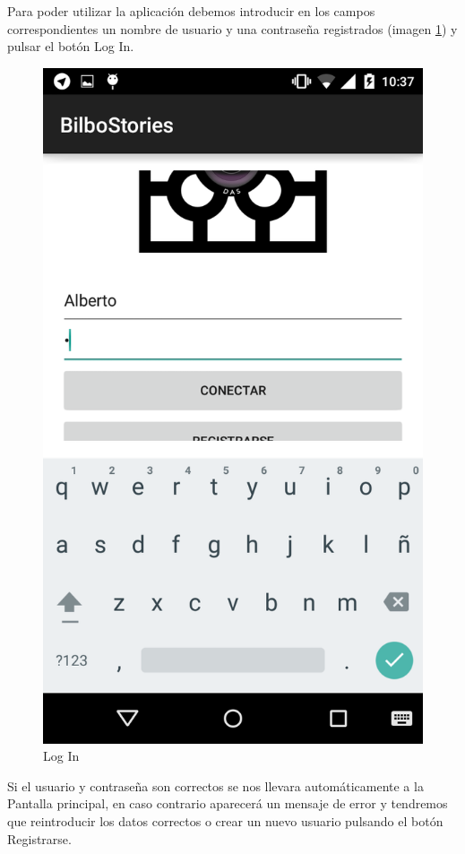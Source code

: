 \documentclass[11pt,a4paper, titlepage]{article}
\begin{document}
Para poder utilizar la aplicación debemos introducir en los campos correspondientes un nombre de usuario y una contraseña registrados (imagen \ref{login2}) y pulsar el botón Log In.
	
	\begin{figure}[hbtp]
		\centering
		\includegraphics[scale = 0.25 ]{img/1}
		\caption{Log In}
		\label{login2}
	\end{figure}
	
	Si el usuario y contraseña son correctos se nos llevara automáticamente a la Pantalla principal, en caso contrario aparecerá un mensaje de error y tendremos que reintroducir los datos correctos o crear un nuevo usuario pulsando el botón Registrarse.
	
\end{document}
